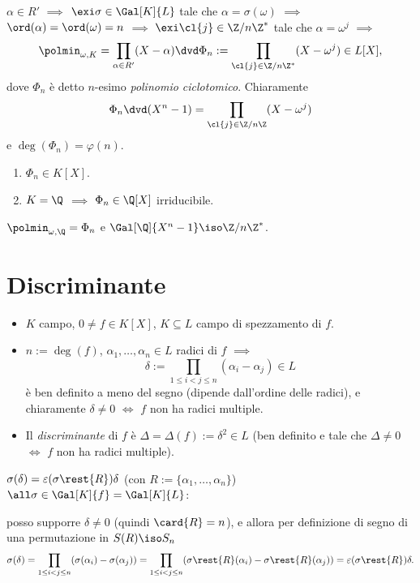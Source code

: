\(\alpha\in R'\) \(\implies\) \(\exi\sigma\in\Gal[K]{L}\) tale che \(\alpha=\sigma(\omega)\) \(\implies\) \(\ord(\alpha)=\ord(\omega)=n\) \(\implies\) \(\exi\cl{j}\in\Z/n\Z^*\) tale che \(\alpha=\omega^j\) \(\implies\)
\[
\polmin_{\omega,K}=\prod_{\alpha\in R'}(X-\alpha)\dvd\Phi_n:=\prod_{\cl{j}\in\Z/n\Z^*}(X-\omega^j)\in L[X],
\]
dove \(\Phi_n\) è detto \(n\)-esimo {\em polinomio ciclotomico}. Chiaramente
\[
\Phi_n\dvd(X^n-1)=\prod_{\cl{j}\in\Z/n\Z}(X-\omega^j)
\]
e \(\deg(\Phi_n)=\varphi(n)\). 
\begin{teor}
\begin{enumerate}
\item \(\Phi_n\in K[X]\).
\item \(K=\Q\) \(\implies\) \(\Phi_n\in\Q[X]\) irriducibile.
\end{enumerate}
\end{teor}
\begin{coro}
\(\polmin_{\omega,\Q}=\Phi_n\) e \(\Gal[\Q]{X^n-1}\iso\Z/n\Z^*\).
\end{coro}



\section{Discriminante}

\begin{itemize}
\item \(K\) campo, \(0\ne f\in K[X]\), \(K\subseteq L\) campo di spezzamento di \(f\).
\item \(n:=\deg(f)\), \(\alpha_1,\dots,\alpha_n\in L\) radici di \(f\) \(\implies\)
\[
\delta:=\prod_{1\le i<j\le n}(\alpha_i-\alpha_j)\in L
\]
è ben definito a meno del segno (dipende dall'ordine delle radici), e chiaramente \(\delta\ne0\) \(\iff\) \(f\) non ha radici multiple.
\item Il {\em discriminante} di \(f\) è \(\Delta=\Delta(f):=\delta^2\in L\) (ben definito e tale che \(\Delta\ne0\) \(\iff\) \(f\) non ha radici multiple).
\end{itemize}
\begin{osse}
\(\sigma(\delta)=\varepsilon(\sigma\rest{R})\delta\) (con \(R:=\{\alpha_1,\dots,\alpha_n\}\)) \(\all\sigma\in\Gal[K]{f}=\Gal[K]{L}\):

posso supporre \(\delta\ne0\) (quindi \(\card{R}=n\)), e allora per definizione di segno di una permutazione in \(S(R)\iso S_n\)
\[
\sigma(\delta)=\prod_{1\le i<j\le n}(\sigma(\alpha_i)-\sigma(\alpha_j))=\prod_{1\le i<j\le n}(\sigma\rest{R}(\alpha_i)-\sigma\rest{R}(\alpha_j))=\varepsilon(\sigma\rest{R})\delta.
\]
\end{osse}



